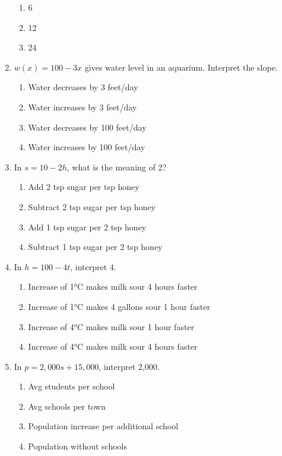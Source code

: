 \documentclass[12pt]{exam}
\begin{document}
\begin{enumerate}
\begin{enumerate}[label=\Alph*)]
        \item 6
        \item 12
        \item 24
    \end{enumerate}
    \item $w(x) = 100 - 3x$ gives water level in an aquarium. Interpret the slope.
    \begin{enumerate}[label=\Alph*)]
        \item Water decreases by 3 feet/day
        \item Water increases by 3 feet/day
        \item Water decreases by 100 feet/day
        \item Water increases by 100 feet/day
    \end{enumerate}
    \item In $s = 10 - 2h$, what is the meaning of 2?
    \begin{enumerate}[label=\Alph*)]
        \item Add 2 tsp sugar per tsp honey
        \item Subtract 2 tsp sugar per tsp honey
        \item Add 1 tsp sugar per 2 tsp honey
        \item Subtract 1 tsp sugar per 2 tsp honey
    \end{enumerate}
    \item In $h = 100 - 4t$, interpret 4.
    \begin{enumerate}[label=\Alph*)]
        \item Increase of 1°C makes milk sour 4 hours faster
        \item Increase of 1°C makes 4 gallons sour 1 hour faster
        \item Increase of 4°C makes milk sour 1 hour faster
        \item Increase of 4°C makes milk sour 4 hours faster
    \end{enumerate}
    \item In $p = 2,000s + 15,000$, interpret 2,000.
    \begin{enumerate}[label=\Alph*)]
        \item Avg students per school
        \item Avg schools per town
        \item Population increase per additional school
        \item Population without schools
    \end{enumerate}

\end{enumerate}
\end{document}
